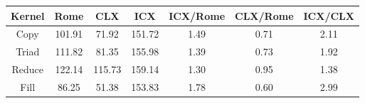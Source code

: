\begin{tabular}{|c|c|c|c|c|c|c|}  \hline
Kernel&Rome&CLX&ICX & ICX/Rome & CLX/Rome & ICX/CLX \\ \hline 
Copy & 101.91 & 71.92 & 151.72  & 1.49 & 0.71 & 2.11 \\ \hline 
Triad & 111.82 & 81.35 & 155.98  & 1.39 & 0.73 & 1.92 \\ \hline 
Reduce & 122.14 & 115.73 & 159.14  & 1.30 & 0.95 & 1.38 \\ \hline 
Fill & 86.25 & 51.38 & 153.83  & 1.78 & 0.60 & 2.99 \\ \hline 
\end{tabular}
